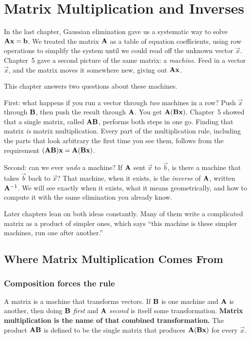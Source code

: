 \chapter{Matrix Multiplication and Inverses}

In the last chapter, Gaussian elimination gave us a systematic way to solve
$\mathbf{A}\mathbf{x} = \mathbf{b}$. We treated the matrix $\mathbf{A}$ as a table of equation coefficients,
using row operations to simplify the system until we could read off the unknown vector
$\vec{x}$. Chapter~5 gave a second picture of the same matrix: a \emph{machine}.
Feed in a vector $\vec{x}$, and the matrix moves it somewhere new, giving out
$\mathbf{A}\mathbf{x}$.

This chapter answers two questions about these machines.

First: what happens if you run a vector through \emph{two} machines in a row? Push
$\vec{x}$ through $\mathbf{B}$, then push the result through $\mathbf{A}$. You get
$\mathbf{A}(\mathbf{B}\mathbf{x})$. Chapter~5 showed that a single matrix, called
$\mathbf{A}\mathbf{B}$, performs both steps in one go. Finding that
matrix \emph{is} matrix multiplication. Every part of the multiplication rule,
including the parts that look arbitrary the first time you see them, follows from
the requirement $(\mathbf{A}\mathbf{B})\mathbf{x} = \mathbf{A}(\mathbf{B}\mathbf{x})$.

Second: can we ever \emph{undo} a machine? If $\mathbf{A}$ sent $\vec{x}$ to $\vec{b}$,
is there a machine that takes $\vec{b}$ back to $\vec{x}$? That machine, when it exists,
is the \emph{inverse} of $\mathbf{A}$, written $\mathbf{A}^{-1}$. We will see exactly when it
exists, what it means geometrically, and how to compute it with the same elimination
you already know.

Later chapters lean on both ideas constantly. Many of them write a complicated matrix
as a product of simpler ones, which says ``this machine is these simpler machines,
run one after another.''

\section{Where Matrix Multiplication Comes From}
\label{ch08:origin}

\subsection{Composition forces the rule}

\begin{intuitionbox}
A matrix is a machine that transforms vectors. If $\mathbf{B}$ is one machine and
$\mathbf{A}$ is another, then doing $\mathbf{B}$ \emph{first} and $\mathbf{A}$ \emph{second}
is itself some transformation. \textbf{Matrix multiplication is the name of that
combined transformation.} The product $\mathbf{A}\mathbf{B}$ is defined to be the single
matrix that produces $\mathbf{A}(\mathbf{B}\mathbf{x})$ for every $\vec{x}$.
\end{intuitionbox}

